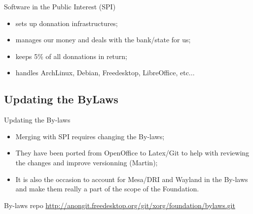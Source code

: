 \documentclass{beamer}
\begin{document}
		\begin{frame}
			\begin{block}{Software in the Public Interest (SPI)}
				\begin{itemize}
					\item sets up donnation infrastructures;
					\item manages our money and deals with the bank/state for us;
					\item keeps 5\% of all donnations in return;
					\item handles ArchLinux, Debian, Freedesktop, LibreOffice, etc...
				\end{itemize}
			\end{block}
		\end{frame}

		\subsection{Updating the ByLaws}
		\begin{frame}
			\begin{block}{Updating the By-laws}
				\begin{itemize}
					\item Merging with SPI requires changing the By-laws;
					\item They have been ported from OpenOffice to Latex/Git to help with
reviewing the changes and improve versionning (Martin);
					\item It is also the occasion to account for 
Mesa/DRI and Wayland in the By-laws and make them really a part of the scope of the Foundation.
				\end{itemize}
			\end{block}

			\begin{block}{By-laws repo}
				\url{http://anongit.freedesktop.org/git/xorg/foundation/bylaws.git}
			\end{block}
		\end{frame}
\end{document}
